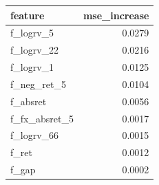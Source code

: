\begin{tabular}{lr}
\toprule
feature & mse_increase \\
\midrule
f_logrv_5 & 0.0279 \\
f_logrv_22 & 0.0216 \\
f_logrv_1 & 0.0125 \\
f_neg_ret_5 & 0.0104 \\
f_absret & 0.0056 \\
f_fx_absret_5 & 0.0017 \\
f_logrv_66 & 0.0015 \\
f_ret & 0.0012 \\
f_gap & 0.0002 \\
\bottomrule
\end{tabular}

